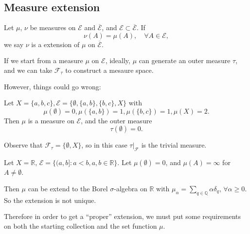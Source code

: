 \subsection{Measure extension}
\label{sub:Measure extension}
\begin{definition}
	Let $\mu$,  $\nu$ be measures on $\mathscr{E}$ and $\overline{\mathscr{E}}$,
	and $\mathscr{E}\subset\overline{\mathscr{E}}$. If
	\[
	\nu(A) = \mu(A) , \quad \forall A\in \mathscr{E},
	\]
	we say $\nu$ is a extension of  $\mu$ on $\overline{\mathscr{E}}$.
\end{definition}

If we start from a measure $\mu$ on  $\mathscr{E}$,
ideally, $\mu$ can generate an outer measure  $\tau$, and we can take
$\mathscr{F}_\tau$ to construct a mesaure space.

However, things could go wrong:
\begin{example}
    Let $X=\{a,b,c\}, \mathscr{E}=\{\emptyset, \{a,b\}, \{b,c\}, X\}$ with
	\[
	\mu(\emptyset)=0, \mu(\{a,b\})=1, \mu(\{b,c\})=1, \mu(X)=2.
	\]
	Then $\mu$ is a measure on  $\mathscr{E}$, and the outer measure
	\[
	\tau(\emptyset) = 0.
	\]

	Observe that $\mathscr{F}_\tau=\{\emptyset, X\}$, so in this case
	$\tau|_{\mathscr{F}}$ is the trivial measure.
\end{example}
\begin{example}
	Let $X=\mathbb{R}$, $\mathscr{E}=\{(a,b]: a<b, a,b\in \mathbb{R}\}$.
	Let $\mu(\emptyset)=0$, and  $\mu(A)=\infty$ for $A\ne \emptyset$.

	Then $\mu$ can be extend to the Borel $\sigma$-algebra on $\mathbb{R}$
	with $\mu_\alpha = \sum_{q\in \mathbb{Q}} \alpha\delta_q$, $\forall \alpha\ge 0$.
	So the extension is not unique.
\end{example}

Therefore in order to get a ``proper'' extension,
we must put some requirements on both
the starting collection and the set function $\mu$.

